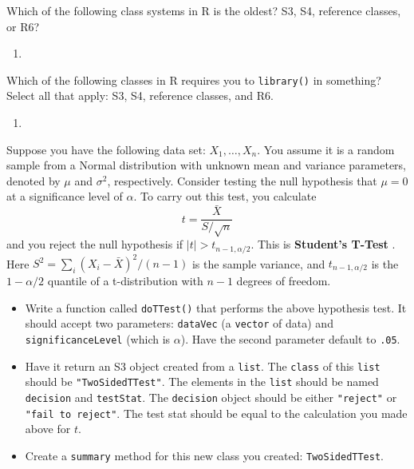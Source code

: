 \documentclass[12pt,krantz2]{krantz}
\providecommand{\tightlist}{%
  \setlength{\itemsep}{0pt}\setlength{\parskip}{0pt}}
\begin{document}
Which of the following class systems in R is the oldest? S3, S4, reference classes, or R6?

\begin{enumerate}
\def\labelenumi{\arabic{enumi}.}
\setcounter{enumi}{7}
\item
\end{enumerate}

Which of the following classes in R requires you to \texttt{library()} in something? Select all that apply: S3, S4, reference classes, and R6.

\begin{enumerate}
\def\labelenumi{\arabic{enumi}.}
\setcounter{enumi}{8}
\item
\end{enumerate}

Suppose you have the following data set: \(X_1, \ldots, X_n\). You assume it is a random sample from a Normal distribution with unknown mean and variance parameters, denoted by \(\mu\) and \(\sigma^2\), respectively. Consider testing the null hypothesis that \(\mu = 0\) at a significance level of \(\alpha\). To carry out this test, you calculate
\begin{equation} 
t = \frac{\bar{X}}{S/\sqrt{n}}
\end{equation}
and you reject the null hypothesis if \(|t| > t_{n-1,\alpha/2}\). This is \textbf{Student's T-Test} \citep{student1908probable}. Here \(S^2 = \sum_i(X_i - \bar{X})^2 / (n-1)\) is the sample variance, and \(t_{n-1,\alpha/2}\) is the \(1-\alpha/2\) quantile of a t-distribution with \(n-1\) degrees of freedom.

\begin{itemize}
\tightlist
\item
  Write a function called \texttt{doTTest()} that performs the above hypothesis test. It should accept two parameters: \texttt{dataVec} (a \texttt{vector} of data) and \texttt{significanceLevel} (which is \(\alpha\)). Have the second parameter default to \texttt{.05}.
\item
  Have it return an S3 object created from a \texttt{list}. The \texttt{class} of this \texttt{list} should be \texttt{"TwoSidedTTest"}. The elements in the \texttt{list} should be named \texttt{decision} and \texttt{testStat}. The \texttt{decision} object should be either \texttt{"reject"} or \texttt{"fail\ to\ reject"}. The test stat should be equal to the calculation you made above for \(t\).
\item
  Create a \texttt{summary} method for this new class you created: \texttt{TwoSidedTTest}.
\end{itemize}
\end{document}
